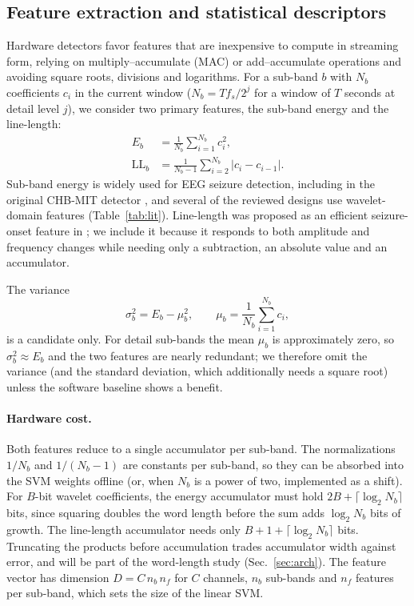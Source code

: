 \documentclass[10pt,twocolumn,letterpaper]{article}
\begin{document}
\subsection{Feature extraction and statistical descriptors}
\label{sec:features}

Hardware detectors favor features that are inexpensive to compute in
streaming form, relying on multiply--accumulate (MAC) or add--accumulate
operations and avoiding square roots, divisions and logarithms. For a
sub-band $b$ with $N_b$ coefficients $c_i$ in the current window
($N_b = T f_s/2^{j}$ for a window of $T$ seconds at detail level $j$),
we consider two primary features, the sub-band energy and the
line-length:
\begin{align}
  E_b &= \frac{1}{N_b}\sum_{i=1}^{N_b} c_i^{2}, \label{eq:energy}\\
  \mathrm{LL}_b &= \frac{1}{N_b-1}\sum_{i=2}^{N_b} \left| c_i - c_{i-1} \right|. \label{eq:ll}
\end{align}
Sub-band energy is widely used for EEG seizure detection, including in
the original CHB-MIT detector \cite{shoeb2010icml}, and several of the
reviewed designs use wavelet-domain features (Table~\ref{tab:lit}).
Line-length was proposed as an efficient seizure-onset feature in
\cite{esteller2001}; we include it because it responds to both amplitude
and frequency changes while needing only a subtraction, an absolute
value and an accumulator.

The variance
\begin{equation}
  \sigma_b^{2} = E_b - \mu_b^{2}, \qquad
  \mu_b = \frac{1}{N_b}\sum_{i=1}^{N_b} c_i,
\end{equation}
is a candidate only. For detail sub-bands the mean $\mu_b$ is
approximately zero, so $\sigma_b^{2}\approx E_b$ and the two features
are nearly redundant; we therefore omit the variance (and the standard
deviation, which additionally needs a square root) unless the software
baseline shows a benefit.

\paragraph{Hardware cost.} Both features reduce to a single accumulator
per sub-band. The normalizations $1/N_b$ and $1/(N_b-1)$ are constants
per sub-band, so they can be absorbed into the SVM weights offline (or,
when $N_b$ is a power of two, implemented as a shift). For $B$-bit
wavelet coefficients, the energy accumulator must hold
$2B+\lceil\log_2 N_b\rceil$ bits, since squaring doubles the word length
before the sum adds $\log_2 N_b$ bits of growth. The line-length
accumulator needs only $B+1+\lceil\log_2 N_b\rceil$ bits. Truncating the
products before accumulation trades accumulator width against error, and
will be part of the word-length study (Sec.~\ref{sec:arch}). The feature
vector has dimension $D = C\, n_b\, n_f$ for $C$ channels, $n_b$
sub-bands and $n_f$ features per sub-band, which sets the size of the
linear SVM.
\end{document}
